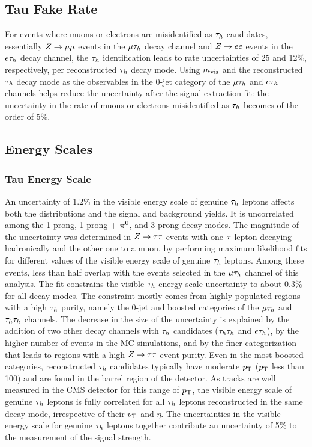 \subsection{Tau Fake Rate}
For events where muons or electrons are misidentified as $\tau_{h}$ candidates, essentially $Z\to \mu\mu$ events in 
the $\mu\tau_{h}$ decay channel and $Z\to ee$ events in the $e\tau_{h}$ decay channel, the $\tau_{h}$ identification leads 
to rate uncertainties of 25 and 12\%, respectively, per reconstructed $\tau_{h}$ decay mode. Using $m_\text{vis}$ and the reconstructed 
$\tau_{h}$ decay mode as the observables in the 0-jet category of the $\mu\tau_{h}$ and $e\tau_{h}$ channels helps reduce the 
uncertainty after the signal extraction fit: the uncertainty in the rate of muons or electrons misidentified as $\tau_{h}$ 
becomes of the order of 5\%. 

\subsection{Energy Scales}
\subsubsection{Tau Energy Scale}
An uncertainty of 1.2\% in the visible energy scale of genuine $\tau_{h}$ leptons affects both the distributions and the
signal and background yields. It is uncorrelated among the 1-prong, 1-prong + $\pi^{0}$, and
3-prong decay modes.
The magnitude of the uncertainty was determined in $Z\to\tau\tau$ events with one $\tau$ lepton decaying hadronically 
and the other one to a muon, by performing maximum likelihood fits for different values of the visible energy scale of 
genuine $\tau_{h}$ leptons. Among these events, less than half overlap with the events selected in the $\mu\tau_{h}$ 
channel of this analysis. The fit constrains the visible $\tau_{h}$ energy scale uncertainty to about
0.3\% for all decay modes. The constraint mostly comes from highly populated regions with a high $\tau_{h}$ purity, namely 
the 0-jet and boosted categories of the $\mu\tau_{h}$ and $\tau_{h}\tau_{h}$ channels. The decrease in the size of the 
uncertainty is explained by the addition of two other decay channels
with $\tau_{h}$ candidates ($\tau_{h}\tau_{h}$ and $e\tau_{h}$), by the higher number of events in the MC simulations, and by the 
finer categorization that leads to regions with a high $Z\to\tau\tau$ event purity.
Even in the most boosted categories, reconstructed $\tau_{h}$ candidates typically have moderate $p_\mathrm{T}$ ($p_\mathrm{T}$ less than 100\GeV) and are
found in the barrel region of the detector. As tracks are well measured in the CMS detector for this range of $p_\mathrm{T}$,
the visible energy scale of genuine $\tau_{h}$ leptons is fully correlated for all $\tau_{h}$ leptons reconstructed in the 
same decay mode, irrespective of their $p_\mathrm{T}$ and $\eta$. The uncertainties in the visible energy scale for genuine 
$\tau_{h}$ leptons together contribute an uncertainty of 5\% to the measurement of the signal strength.


